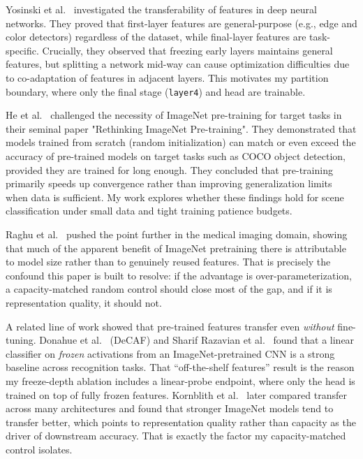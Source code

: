 \documentclass[conference]{IEEEtran}
\begin{document}
Yosinski et al.~\cite{yosinski2014transferable} investigated the transferability of features in deep neural networks. They proved that first-layer features are general-purpose (e.g., edge and color detectors) regardless of the dataset, while final-layer features are task-specific. Crucially, they observed that freezing early layers maintains general features, but splitting a network mid-way can cause optimization difficulties due to co-adaptation of features in adjacent layers. This motivates my partition boundary, where only the final stage (\texttt{layer4}) and head are trainable.

He et al.~\cite{he2019rethinking} challenged the necessity of ImageNet pre-training for target tasks in their seminal paper "Rethinking ImageNet Pre-training". They demonstrated that models trained from scratch (random initialization) can match or even exceed the accuracy of pre-trained models on target tasks such as COCO object detection, provided they are trained for long enough. They concluded that pre-training primarily speeds up convergence rather than improving generalization limits when data is sufficient. My work explores whether these findings hold for scene classification under small data and tight training patience budgets.

Raghu et al.~\cite{raghu2019transfusion} pushed the point further in the medical imaging domain, showing that much of the apparent benefit of ImageNet pretraining there is attributable to model size rather than to genuinely reused features. That is precisely the confound this paper is built to resolve: if the advantage is over-parameterization, a capacity-matched random control should close most of the gap, and if it is representation quality, it should not.

A related line of work showed that pre-trained features transfer even \emph{without} fine-tuning. Donahue et al.~\cite{donahue2014decaf} (DeCAF) and Sharif Razavian et al.~\cite{razavian2014cnn} found that a linear classifier on \emph{frozen} activations from an ImageNet-pretrained CNN is a strong baseline across recognition tasks. That ``off-the-shelf features'' result is the reason my freeze-depth ablation includes a linear-probe endpoint, where only the head is trained on top of fully frozen features. Kornblith et al.~\cite{kornblith2019better} later compared transfer across many architectures and found that stronger ImageNet models tend to transfer better, which points to representation quality rather than capacity as the driver of downstream accuracy. That is exactly the factor my capacity-matched control isolates.
\end{document}
